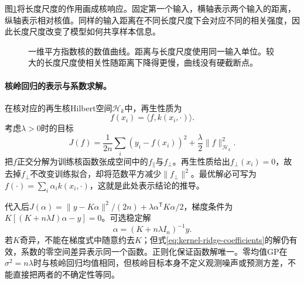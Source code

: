 图\ref{fig:kernel-length-scale}将长度尺度的作用画成核响应。固定第一个输入，横轴表示两个输入的距离，纵轴表示相对核值。同样的输入距离在不同长度尺度下会对应不同的相关强度，因此长度尺度改变了模型如何共享样本信息。
\begin{figure}[htbp]
\centering
{}
\caption{一维平方指数核的数值曲线。距离与长度尺度使用同一输入单位。较大的长度尺度使相关性随距离下降得更慢，曲线没有硬截断点。}
\label{fig:kernel-length-scale}
\end{figure}

\paragraph{核岭回归的表示与系数求解。}
在核对应的再生核Hilbert空间$\mathcal H_k$中，再生性质为
\begin{equation}
 f(x_i)=\langle f,k(x_i,\cdot)\rangle.
\end{equation}
考虑$\lambda>0$时的目标
\begin{equation}
 J(f)=\frac1{2n}\sum_i(y_i-f(x_i))^2+\frac\lambda2\|f\|_{\mathcal H_k}^2.
\end{equation}
把$f$正交分解为训练核函数张成空间中的$f_\parallel$与$f_\perp$。再生性质给出$f_\perp(x_i)=0$，故去掉$f_\perp$不改变训练拟合，却将范数平方减少$\|f_\perp\|^2$。最优解必可写为$f(\cdot)=\sum_i\alpha_i k(x_i,\cdot)$，这就是此处表示结论的推导。

代入后$J(\alpha)=\|y-K\alpha\|^2/(2n)+\lambda\alpha^{\mathsf T}K\alpha/2$，梯度条件为$K[(K+n\lambda I)\alpha-y]=0$。可选稳定解
\begin{equation}
 \alpha=(K+n\lambda I_n)^{-1}y.\label{eq:kernel-ridge-coefficients}
\end{equation}
若$K$奇异，不能在梯度式中随意约去$K$；但式\eqref{eq:kernel-ridge-coefficients}的解仍有效，系数的零空间差异表示同一个函数。正则化保证函数解唯一。零均值GP在$\sigma^2=n\lambda$时与核岭回归均值相同，但核岭目标本身不定义观测噪声或预测方差，不能直接把两者的不确定性等同。

